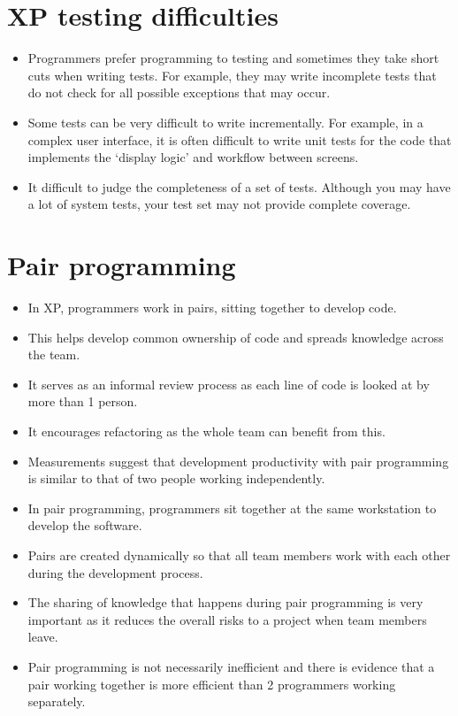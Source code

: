 \section{ XP testing difficulties}
\begin{itemize}
\item Programmers prefer programming to testing and sometimes they take short cuts when writing tests. For example, they may write incomplete tests that do not check for all possible exceptions that may occur.

\item Some tests can be very difficult to write incrementally. For example, in a complex user interface, it is often difficult to write unit tests for the code that implements the ‘display logic’ and workflow between screens.

\item It difficult to judge the completeness of a set of tests. Although you may have a lot of system tests, your test set may not provide complete coverage.


\end{itemize}
\section{ Pair programming}
\begin{itemize}

\item In XP, programmers work in pairs, sitting together to develop code.

\item This helps develop common ownership of code and spreads knowledge across the team.

\item It serves as an informal review process as each line of code is looked at by more than 1 person.

\item It encourages refactoring as the whole team can benefit from this.

\item Measurements suggest that development productivity with pair programming is similar to that of two people working independently.

\item In pair programming, programmers sit together at the same workstation to develop the software.

\item Pairs are created dynamically so that all team members work with each other during the development process.

\item The sharing of knowledge that happens during pair programming is very important as it reduces the overall risks to a project when team members leave.

\item Pair programming is not necessarily inefficient and there is evidence that a pair working together is more efficient than 2 programmers working separately.
\end{itemize}
